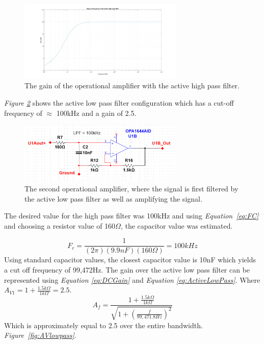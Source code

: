 \clearpage

\begin{figure}[h]
    \centering
    \includegraphics[width=0.7\textwidth]{graphics/Av_Highpass.png}
    \caption{The gain of the operational amplifier with the active high pass filter.}
    \label{fig:AVhighpass}
\end{figure}



\textit{Figure \ref{fig:Opamp2}} shows the active low pass filter configuration which has a cut-off frequency of $\approx$ 100kHz and a gain of 2.5.

\begin{figure}[h]
    \centering
    \includegraphics[width=0.7\textwidth]{graphics/OPamp2.png}
    \caption{The second operational amplifier, where the signal is first filtered by the active low pass filter as well as amplifying the signal.}
    \label{fig:Opamp2}
\end{figure}

The desired value for the high pass filter was 100kHz and using \textit{Equation~\ref{eq:FC}} and choosing a resistor value of 160$\Omega$, the capacitor value was estimated.   

$$F_c = \frac{1}{(2\pi)( 9.9nF )( 160\Omega)} = 100kHz$$
Using standard capacitor values, the closest capacitor value is 10nF which yields a cut off frequency of 99,472Hz.
The gain over the active low pass filter can be represented using \textit{Equation \ref{eq:DCGain}} and \textit{Equation \ref{eq:ActiveLowPass}}. 
Where $A_{V1} = 1 + \frac{1.5k\Omega}{1k\Omega} = 2.5$.
$$A_f  = \frac{1 + \frac{1.5k\Omega}{1k\Omega}}{\sqrt{1 + (\frac{f}{99,471.8Hz})^2}}$$
Which is approximately equal to 2.5 over the entire bandwidth. 
\textit{Figure~\ref{fig:AVlowpass}}.

